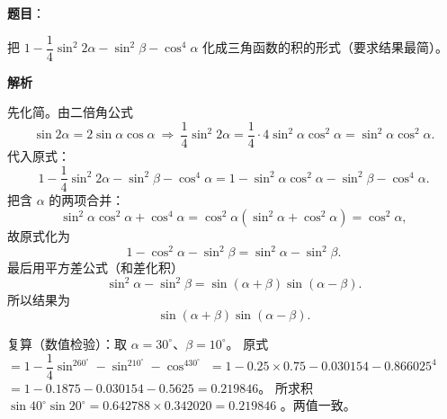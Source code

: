\begin{answer}

\textbf{题目}：

把 $1-\dfrac14\sin^2 2\alpha-\sin^2\beta-\cos^4\alpha$ 化成三角函数的积的形式（要求结果最简）。

\textbf{解析}

先化简。由二倍角公式
\nopagebreak[4]
\[
\sin2\alpha=2\sin\alpha\cos\alpha\ \Longrightarrow\ \frac14\sin^2 2\alpha=\frac14\cdot4\sin^2\alpha\cos^2\alpha=\sin^2\alpha\cos^2\alpha.
\]
代入原式：
\nopagebreak[4]
\[
1-\frac14\sin^2 2\alpha-\sin^2\beta-\cos^4\alpha
=1-\sin^2\alpha\cos^2\alpha-\sin^2\beta-\cos^4\alpha.
\]
把含 $\alpha$ 的两项合并：
\nopagebreak[4]
\[
\sin^2\alpha\cos^2\alpha+\cos^4\alpha=\cos^2\alpha(\sin^2\alpha+\cos^2\alpha)=\cos^2\alpha,
\]
故原式化为
\nopagebreak[4]
\[
1-\cos^2\alpha-\sin^2\beta=\sin^2\alpha-\sin^2\beta.
\]
最后用平方差公式（和差化积）
\nopagebreak[4]
\[
\sin^2\alpha-\sin^2\beta=\sin(\alpha+\beta)\sin(\alpha-\beta).
\]
所以结果为
\nopagebreak[4]
\[
\sin(\alpha+\beta)\sin(\alpha-\beta).
\]

复算（数值检验）：取 $\alpha=30^\circ$、$\beta=10^\circ$。
原式 $=1-\dfrac14\sin^260^\circ-\sin^210^\circ-\cos^430^\circ$
$=1-0.25\times0.75-0.030154-0.866025^4$
$=1-0.1875-0.030154-0.5625=0.219846$。
所求积 $\sin40^\circ\sin20^\circ=0.642788\times0.342020=0.219846$ 。两值一致。


\end{answer}
